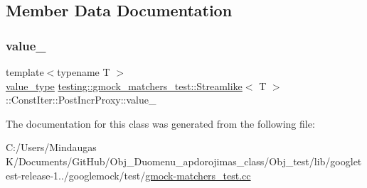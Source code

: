 \subsection{Member Data Documentation}
\mbox{\label{classtesting_1_1gmock__matchers__test_1_1_streamlike_1_1_const_iter_1_1_post_incr_proxy_aa04014411e1321be24afff005e2ff09e}} 
\subsubsection{\texorpdfstring{value\_}{value\_}}
{\footnotesize\ttfamily template$<$typename T $>$ \\
\mbox{\hyperlink{classtesting_1_1gmock__matchers__test_1_1_streamlike_a7e2c2e021676c1ed5dea63cdd019661c}{value\+\_\+type}} \mbox{\hyperlink{classtesting_1_1gmock__matchers__test_1_1_streamlike}{testing\+::gmock\+\_\+matchers\+\_\+test\+::\+Streamlike}}$<$ T $>$\+::Const\+Iter\+::\+Post\+Incr\+Proxy\+::value\+\_\+\hspace{0.3cm}{\ttfamily [private]}}



The documentation for this class was generated from the following file\+:\begin{DoxyCompactItemize}
\item 
C\+:/\+Users/\+Mindaugas K/\+Documents/\+Git\+Hub/\+Obj\+\_\+\+Duomenu\+\_\+apdorojimas\+\_\+class/\+Obj\+\_\+test/lib/googletest-\/release-\/1../googlemock/test/\mbox{\hyperlink{_obj__test_2lib_2googletest-release-1_88_81_2googlemock_2test_2gmock-matchers__test_8cc}{gmock-\/matchers\+\_\+test.\+cc}}\end{DoxyCompactItemize}
